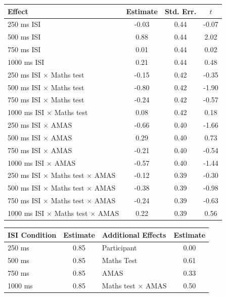 \documentclass[man,floatsintext]{apa6}
\theoremstyle{definition}
\theoremstyle{definition}
\theoremstyle{definition}
\theoremstyle{remark}
\begin{document}
\begin{appendix}
\begin{table}[!p]
\begin{subtable}{\textwidth}
\begin{table}[H]
\begin{tabular}{lccc}
\toprule
Effect & Estimate & Std. Err. & $t$\\
\midrule
250 ms ISI & -0.03 & 0.44 & -0.07\\
500 ms ISI & 0.88 & 0.44 & 2.02\\
750 ms ISI & 0.01 & 0.44 & 0.02\\
1000 ms ISI & 0.21 & 0.44 & 0.48\\
250 ms ISI $\times$ Maths test & -0.15 & 0.42 & -0.35\\
500 ms ISI $\times$ Maths test & -0.80 & 0.42 & -1.90\\
750 ms ISI $\times$ Maths test & -0.24 & 0.42 & -0.57\\
1000 ms ISI $\times$ Maths test & 0.08 & 0.42 & 0.18\\
250 ms ISI $\times$ AMAS & -0.66 & 0.40 & -1.66\\
500 ms ISI $\times$ AMAS & 0.29 & 0.40 & 0.73\\
750 ms ISI $\times$ AMAS & -0.21 & 0.40 & -0.54\\
1000 ms ISI $\times$ AMAS & -0.57 & 0.40 & -1.44\\
250 ms ISI $\times$ Maths test $\times$ AMAS & -0.12 & 0.39 & -0.30\\
500 ms ISI $\times$ Maths test $\times$ AMAS & -0.38 & 0.39 & -0.98\\
750 ms ISI $\times$ Maths test $\times$ AMAS & -0.24 & 0.39 & -0.63\\
1000 ms ISI $\times$ Maths test $\times$ AMAS & 0.22 & 0.39 & 0.56\\
\bottomrule
\end{tabular}\endgroup{}
\end{table}
\end{subtable}
\begin{subtable}{\textwidth}
\caption{Variance Component Estimates. Estimates are presented on the standard deviation scale.}
\centering
\begin{table}[H]\centering\begingroup\fontsize{10}{12}\selectfont

\begin{tabular}{lc|lc}
\toprule
ISI Condition & Estimate & Additional Effects & Estimate\\
\midrule
250 ms & 0.85 & Participant & 0.00\\
500 ms & 0.85 & Maths Test & 0.61\\
750 ms & 0.85 & AMAS & 0.33\\
1000 ms & 0.85 & Maths test $\times$ AMAS & 0.50\\
\bottomrule
\end{tabular}\endgroup{}
\end{table}
\end{subtable}
\end{table}


\end{appendix}
\end{document}
